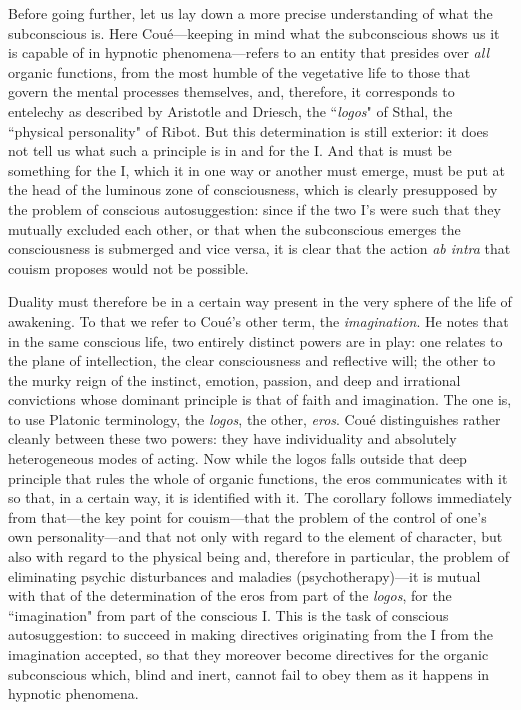 Before going further, let us lay down a more precise understanding of what the subconscious is. Here Coué—keeping in mind what the subconscious shows us it is capable of in hypnotic phenomena—refers to an entity that presides over \textit{all} organic functions, from the most humble of the vegetative life to those that govern the mental processes themselves, and, therefore, it corresponds to entelechy as described by Aristotle and Driesch, the ``\textit{logos}" of Sthal, the ``physical personality" of Ribot. But this determination is still exterior: it does not tell us what such a principle is in and for the I. And that is must be something for the I, which it in one way or another must emerge, must be put at the head of the luminous zone of consciousness, which is clearly presupposed by the problem of conscious autosuggestion: since if the two I's were such that they mutually excluded each other, or that when the subconscious emerges the consciousness is submerged and vice versa, it is clear that the action \textit{ab intra} that couism proposes would not be possible.

Duality must therefore be in a certain way present in the very sphere of the life of awakening. To that we refer to Coué's other term, the \textit{imagination}. He notes that in the same conscious life, two entirely distinct powers are in play: one relates to the plane of intellection, the clear consciousness and reflective will; the other to the murky reign of the instinct, emotion, passion, and deep and irrational convictions whose dominant principle is that of faith and imagination. The one is, to use Platonic terminology, the \textit{logos}, the other, \textit{eros}. Coué distinguishes rather cleanly between these two powers: they have individuality and absolutely heterogeneous modes of acting. Now while the logos falls outside that deep principle that rules the whole of organic functions, the eros communicates with it so that, in a certain way, it is identified with it. The corollary follows immediately from that—the key point for couism—that the problem of the control of one's own personality—and that not only with regard to the element of character, but also with regard to the physical being and, therefore in particular, the problem of eliminating psychic disturbances and maladies (psychotherapy)—it is mutual with that of the determination of the eros from part of the \textit{logos}, for the ``imagination" from part of the conscious I. This is the task of conscious autosuggestion: to succeed in making directives originating from the I from the imagination accepted, so that they moreover become directives for the organic subconscious which, blind and inert, cannot fail to obey them as it happens in hypnotic phenomena.


